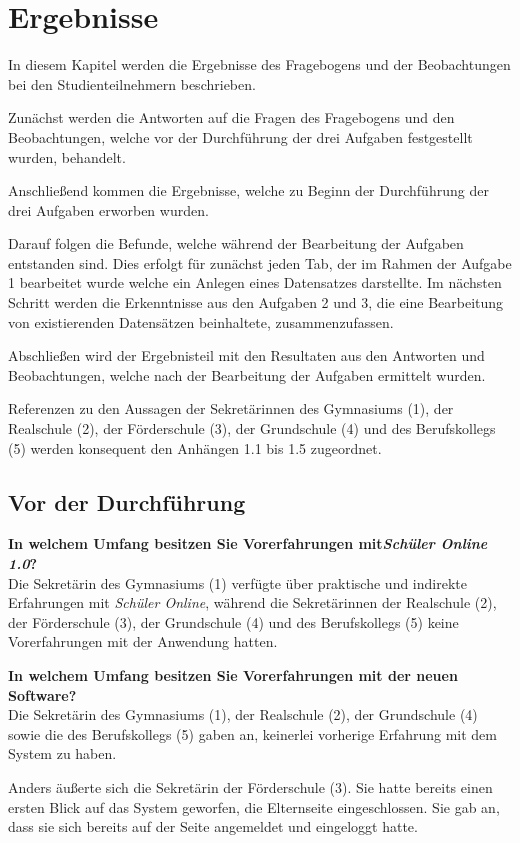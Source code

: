 \section{Ergebnisse}

In diesem Kapitel werden die Ergebnisse des Fragebogens und der Beobachtungen bei den Studienteilnehmern beschrieben.

Zunächst werden die Antworten auf die Fragen des Fragebogens und den Beobachtungen, welche vor der Durchführung der drei Aufgaben festgestellt wurden, behandelt. 

Anschließend kommen die Ergebnisse, welche zu Beginn der Durchführung der drei Aufgaben erworben wurden.

Darauf folgen die Befunde, welche während der Bearbeitung der Aufgaben entstanden sind. Dies erfolgt für zunächst jeden Tab, der im Rahmen der Aufgabe 1 bearbeitet wurde welche ein Anlegen eines Datensatzes darstellte. Im nächsten Schritt werden die Erkenntnisse aus den Aufgaben 2 und 3, die eine Bearbeitung von existierenden Datensätzen beinhaltete, zusammenzufassen.

Abschließen wird der Ergebnisteil mit den Resultaten aus den Antworten und Beobachtungen, welche nach der Bearbeitung der Aufgaben ermittelt wurden.

Referenzen zu den Aussagen der Sekretärinnen des Gymnasiums (1), der Realschule (2), der Förderschule (3), der Grundschule (4) und des Berufskollegs (5) werden konsequent den Anhängen 1.1 bis 1.5 zugeordnet.

\subsection{Vor der Durchführung}
\textbf{In welchem Umfang besitzen Sie Vorerfahrungen mit\textit{Schüler Online 1.0}?}\\
Die Sekretärin des Gymnasiums (1) verfügte über praktische und indirekte Erfahrungen mit \textit{Schüler Online}, während die Sekretärinnen der Realschule (2), der Förderschule (3), der Grundschule (4) und des Berufskollegs (5) keine Vorerfahrungen mit der Anwendung hatten.

\textbf{In welchem Umfang besitzen Sie Vorerfahrungen mit der neuen Software?}\\
Die Sekretärin des Gymnasiums (1), der Realschule (2), der Grundschule (4) sowie die des Berufskollegs (5) gaben an, keinerlei vorherige Erfahrung mit dem System zu haben.

Anders äußerte sich die Sekretärin der Förderschule (3). Sie hatte bereits einen ersten Blick auf das System geworfen, die Elternseite eingeschlossen. Sie gab an, dass sie sich bereits auf der Seite angemeldet und eingeloggt hatte.

